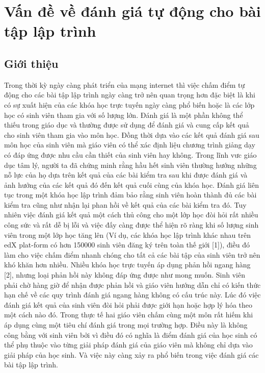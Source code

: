 \documentclass[12pt,a4paper]{article}
\author{Huu Tai}
\begin{document}
\section{Vấn đề về đánh giá tự động cho bài tập lập trình}
\subsection{Giới thiệu}
Trong thời kỳ ngày càng phát triển của mạng internet thì việc chấm điểm tự động cho các bài tập lập trình ngày càng trở nên quan trọng hơn đặc biệt là khi có sự xuất hiện của các khóa học trực tuyến ngày càng phổ biến hoặc là các lớp học có sinh viên tham gia với số lượng lớn. Đánh giá là một phần không thể thiếu trong giáo dục và thường được sử dụng để đánh giá và cung cấp kết quả cho sinh viên tham gia vào môn học. Đồng thời dựa vào các kết quả đánh giá sau môn học của sinh viên mà giáo viên có thể xác định liệu chương trình giảng dạy có đáp ứng được nhu cầu cần thiết của sinh viên hay không.\newline  
\indent Trong lĩnh vưc giáo dục tâm lý, người ta đã chứng minh rằng hầu hết sinh viên thường hướng những nỗ lực của họ dựa trên kết quả của các bài kiểm tra sau khi được đánh giá và ảnh hưởng của các kết quả đó đến kết quả cuối cùng của khóa học. Đánh giá liên tục trong một khóa học lập trình đảm bảo rằng sinh viên hoàn thành đủ các bài kiểm tra cũng như nhận lại phan hồi về kết quả của các bài kiểm tra đó. Tuy nhiên việc đánh giá kết quả một cách thủ công cho một lớp học đòi hỏi rất nhiều công sức và rất dễ bị lỗi và việc đấy càng được thể hiện rõ ràng khi số lượng sinh viên trong một lớp học tăng lên (Ví dụ, các khóa học lập trình khác nhau trên edX plat-form có hơn 150000 sinh viên đăng ký trên toàn thế giới [1]), điều đó làm cho việc chấm điểm nhanh chóng cho tất cả các bài tập của sinh viên trở nên khó khăn hơn nhiều. Nhiều khóa học trực tuyến áp dụng phản hồi ngang hàng [2], nhưng loại phản hồi này không đáp ứng được như mong muốn. Sinh viên phải chờ hàng giờ để nhận được phản hồi và giáo viên hướng dẫn chỉ có kiến thức hạn chế về các quy trình đánh giá ngang hàng không có cấu trúc này. Lúc đó việc đánh giá kết quả của sinh viên đòi hỏi phải được giới hạn hoặc hợp lý hóa theo một cách nào đó.\newline
\indent Trong thực tế hai giáo viên chấm cùng một môn rất hiếm khi áp dụng cùng một tiêu chí đánh giá trong mọi trường hợp. Điều này là không công bằng với sinh viên bởi vì điều đó có nghĩa là điểm đánh giá của học sinh có thể phụ thuộc vào từng giải pháp đánh giá của giáo viên mà không chỉ dựa vào giải pháp của học sinh. Và việc này càng xảy ra phổ biến trong việc đánh giá các bài tập lập trình.\newline
\end{document}
